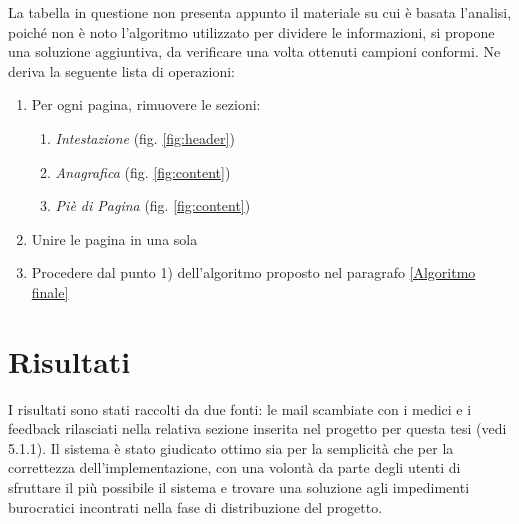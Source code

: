 La tabella in questione non presenta appunto il materiale su cui è basata l'analisi, poiché non è noto l'algoritmo utilizzato per dividere le informazioni, si propone una soluzione aggiuntiva, da verificare una volta ottenuti campioni conformi. 
\newline
Ne deriva la seguente lista di operazioni:
\begin{enumerate}
	\item Per ogni pagina, rimuovere le sezioni:
	\begin{enumerate}
		\item \textit{Intestazione} (fig. \ref{fig:header})
		\item \textit{Anagrafica} (fig. \ref{fig:content})	
		\item \textit{Piè di Pagina} (fig. \ref{fig:content})
	\end{enumerate}	
	\item Unire le pagina in una sola
	\item Procedere dal punto 1) dell'algoritmo proposto nel paragrafo \ref{Algoritmo finale}
\end{enumerate}
\newpage
\section{Risultati}
I risultati sono stati raccolti da due fonti: le mail scambiate con i medici e i feedback rilasciati nella relativa sezione inserita nel progetto per questa tesi (vedi 5.1.1).
Il sistema è stato giudicato ottimo sia per la semplicità che per la correttezza dell'implementazione, con una volontà da parte degli utenti di sfruttare il più possibile il sistema e trovare una soluzione agli impedimenti burocratici incontrati nella fase di distribuzione del progetto.




